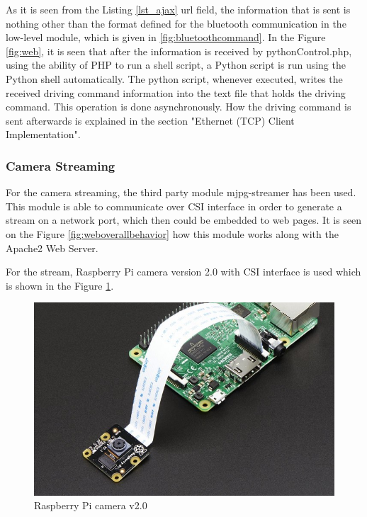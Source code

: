 As it is seen from the Listing \ref{lst_ajax} url field, the information that is sent is nothing other than the format defined for the bluetooth communication in the low-level module, which is given in \ref{fig:bluetoothcommand}. In the Figure \ref{fig:web}, it is seen that after the information is received by pythonControl.php, using the ability of PHP to run a shell script, a Python script is run using the Python shell automatically. The python script, whenever executed, writes the received driving command information into the text file that holds the driving command. This operation is done asynchronously. How the driving command is sent afterwards is explained in the section "Ethernet (TCP) Client Implementation".
\subsubsection{Camera Streaming}
For the camera streaming, the third party module mjpg-streamer \cite{mjpgstreamergithub} has been used. This module is able to communicate over CSI interface in order to generate a stream on a network port, which then could be embedded to web pages. It is seen on the Figure \ref{fig:weboverallbehavior} how this module works along with the Apache2 Web Server. 

For the stream, Raspberry Pi camera version 2.0 with CSI interface is used which is shown in the Figure \ref{fig:rpicam20}.

\begin{figure}[!ht]
	\includegraphics[scale=0.5]{content/images/rpicam20.jpg}
	\caption{Raspberry Pi camera v2.0}
	\label{fig:rpicam20}
\end{figure}


